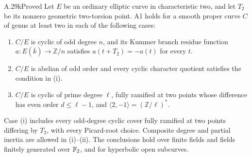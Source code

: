 \begin{claim}{A.29k}{Proved}
Let $E$ be an ordinary elliptic curve in characteristic
two, and let $T_2$ be its nonzero geometric two-torsion
point. A1 holds for a smooth proper curve $C$ of genus
at least two in each of the following cases:
\begin{enumerate}[label=(\roman*)]
\item $C/E$ is cyclic of odd degree $n$, and its Kummer
branch residue function $a:E(\overline k)\to\mathbb Z/n$
satisfies $a(t+T_2)=-a(t)$ for every $t$.
\item $C/E$ is abelian of odd order and every cyclic
character quotient satisfies the condition in \textup{(i)}.
\item $C/E$ is cyclic of prime degree $\ell$, fully
ramified at two points whose difference has even order
$d\le\ell-1$, and
$\langle2,-1\rangle=(\mathbb Z/\ell)^*$.
\end{enumerate}
Case \textup{(i)} includes every odd-degree cyclic
cover fully ramified at two points differing by $T_2$,
with every Picard-root choice. Composite degree and
partial inertia are allowed in \textup{(i)--(ii)}.
The conclusions hold over finite fields and fields
finitely generated over $\mathbb F_2$, and for hyperbolic open
subcurves.
\end{claim}
